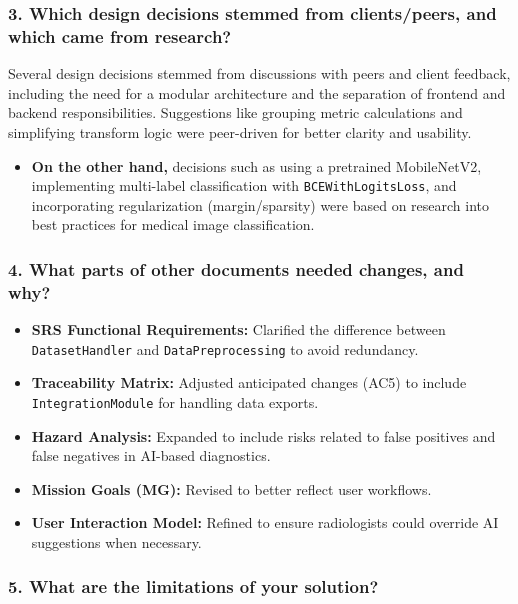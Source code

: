 \documentclass[12pt, titlepage]{article}
\begin{document}
\subsubsection{3. Which design decisions stemmed from clients/peers, and which came from research?}
\label{sec:designdecisions}

Several design decisions stemmed from discussions with peers and client feedback, including the need for a modular architecture and the separation of frontend and backend responsibilities. Suggestions like grouping metric calculations and simplifying transform logic were peer-driven for better clarity and usability. 

\begin{itemize}
    \item \textbf{On the other hand,} decisions such as using a pretrained MobileNetV2, implementing multi-label classification with \texttt{BCEWithLogitsLoss}, and incorporating regularization (margin/sparsity) were based on research into best practices for medical image classification.
\end{itemize}

\subsubsection{4. What parts of other documents needed changes, and why?}
\label{sec:documentschanges}

\begin{itemize}
    \item \textbf{SRS Functional Requirements:} Clarified the difference between \texttt{DatasetHandler} and \texttt{DataPreprocessing} to avoid redundancy.
    \item \textbf{Traceability Matrix:} Adjusted anticipated changes (AC5) to include \texttt{IntegrationModule} for handling data exports.
    \item \textbf{Hazard Analysis:} Expanded to include risks related to false positives and false negatives in AI-based diagnostics.
    \item \textbf{Mission Goals (MG):} Revised to better reflect user workflows.
    \item \textbf{User Interaction Model:} Refined to ensure radiologists could override AI suggestions when necessary.
\end{itemize}

\subsubsection{5. What are the limitations of your solution?}
\label{sec:limitations}
\end{document}
